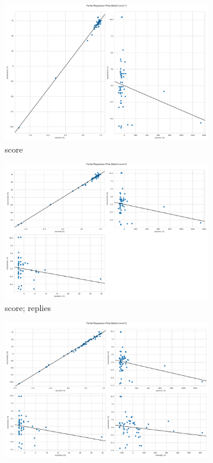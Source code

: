 \documentclass[11pt, oneside]{article}   	%
\begin{document}
\begin{figure}[H]
\centering
\begin{subfigure}{.5\textwidth}
  \centering
  \includegraphics[width=\linewidth]{../plots/fnn_data/hierarchy1/partial_regression_0}
  \caption{score}
\end{subfigure}%
\begin{subfigure}{.5\textwidth}
  \centering
  \includegraphics[width=\linewidth]{../plots/fnn_data/hierarchy1/partial_regression_1}
  \caption{score; replies}
\end{subfigure}
\begin{subfigure}{.5\textwidth}
  \centering
  \includegraphics[width=\linewidth]{../plots/fnn_data/hierarchy1/partial_regression_2}

\end{subfigure}
\end{figure}
\end{document}
